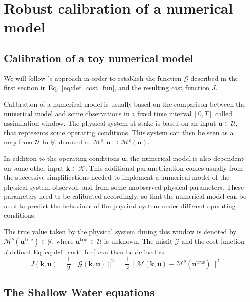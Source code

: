 \documentclass[preprint, 1p]{elsarticle}
\begin{document}
\section{Robust calibration of a numerical model}
\label{sec:SWE_application}

\subsection{Calibration of a toy numerical model}
 We will follow \citeauthor{kennedy_bayesian_2001}'s approach in order to establish the function $\mathcal{G}$ described in the first section in Eq.~\eqref{eq:def_cost_fun}, and the resulting cost function $J$.
 
 Calibration of a numerical model is usually based on the comparison between the numerical model and some observations in a fixed time interval $[0, T]$ called assimilation window.
The physical system at stake is based on an input $\mathbf{u} \in \mathcal{U}$, that represents some operating conditions. This system can then be seen as a map from $\mathcal{U}$ to $\mathcal{Y}$, denoted as $\mathcal{M}^o : \mathbf{u}\mapsto \mathcal{M}^o(\mathbf{u})$. 

In addition to the operating conditions $\mathbf{u}$, the numerical model is also dependent on some other input $\mathbf{k}\in\mathcal{K}$. This additional parametrization comes usually from the successive simplifications needed to implement a numerical model of the physical system observed, and from some unobserved physical parameters. These parameters need to be calibrated accordingly, so that the numerical model can be used to predict the behaviour of the physical system under different operating conditions.

The true value taken by the physical system during this window is denoted by $\mathcal{M}^o(\mathbf{u}^{\mathrm{true}}) \in \mathcal{Y}$, where $\mathbf{u}^{\mathrm{true}} \in \mathcal{U}$ is unknown. The misfit $\mathcal{G}$ and the cost function $J$ defined Eq.\eqref{eq:def_cost_fun} can then be defined as
\begin{equation}
J(\mathbf{k},\mathbf{u}) = \frac12 \| \mathcal{G}(\mathbf{k},\mathbf{u}) \|^2 = \frac12 \|\mathcal{M}(\mathbf{k},\mathbf{u}) - \mathcal{M}^{o}(\mathbf{u}^{\mathrm{true}}) \|^2
\end{equation}
\subsection{The Shallow Water equations}
\end{document}
